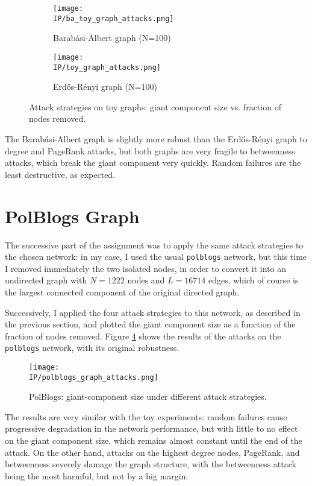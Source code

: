 \documentclass{article}
\newcommand{\IP}{../results}
\begin{document}
\begin{figure}[H]
   \centering
   \begin{subfigure}{0.49\textwidth}
      \texttt{[image: \\IP/ba\_toy\_graph\_attacks.png]}
      \caption{Barabási-Albert graph (N=100)}
      \label{fig:toy:ba}
   \end{subfigure}
   \hfill
   \begin{subfigure}{0.49\textwidth}
      \texttt{[image: \\IP/toy\_graph\_attacks.png]}
      \caption{Erdős-Rényi graph (N=100)}
      \label{fig:toy:er}
   \end{subfigure}
   \caption{Attack strategies on toy graphs: giant component size vs. fraction of nodes removed.}
   \label{fig:toy:attacks}
\end{figure}

The Barabási-Albert graph is slightly more robust than the Erdős-Rényi graph to degree and PageRank attacks, but both graphs are very fragile to betweenness attacks, which break the giant component very quickly.
Random failures are the least destructive, as expected.


\section{PolBlogs Graph}\label{sec:polblogs}
The successive part of the assignment was to apply the same attack strategies to the chosen network: in my case, I used the usual \texttt{polblogs} network, but this time I removed immediately the two isolated nodes, in order to convert it into an undirected graph with $N=1222$ nodes and $L=16714$ edges, which of course is the largest connected component of the original directed graph.

Successively, I applied the four attack strategies to this network, as described in the previous section, and plotted the giant component size as a function of the fraction of nodes removed.
Figure \ref{fig:polblogs_attacks} shows the results of the attacks on the \texttt{polblogs} network, with its original robustness. 

\begin{figure}[H]
  \centering
  \texttt{[image: \\IP/polblogs\_graph\_attacks.png]}
  \caption{PolBlogs: giant-component size under different attack strategies.}
  \label{fig:polblogs_attacks}
\end{figure}

The results are very similar with the toy experiments: random failures cause progressive degradation in the network performance, but with little to no effect on the giant component size, which remains almost constant until the end of the attack.
On the other hand, attacks on the highest degree nodes, PageRank, and betweenness severely damage the graph structure, with the betweenness attack being the most harmful, but not by a big margin.
\end{document}
